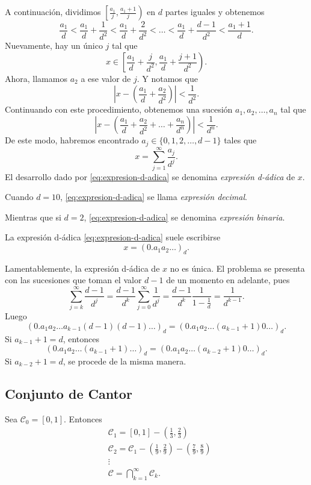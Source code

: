  A continuaci\'on,  dividimos $\left[\frac{a_1}{j}, \frac{a_1+1}{j} \right)$ en $d$ partes iguales y obtenemos
 \[
 \frac{a_1}{d}<\frac{a_1}{d}+\frac{1}{d^2}<\frac{a_1}{d}+\frac{2}{d^2}
 < \ldots<\frac{a_1}{d}+\frac{d-1}{d^2}<\frac{a_1+1}{d}.
 \]
 Nuevamente, hay un \'unico $j$ tal que 
 \[x \in \left[\frac{a_1}{d}+\frac{j}{d^2}, \frac{a_1}{d}+\frac{j+1}{d^2}\right).
 \]
 Ahora, llamamos $a_2$  a ese valor de $j$. Y notamos que 
 \[
 \left|x-\left(\frac{a_1}{d}+\frac{a_2}{d^2}\right)\right|<\frac{1}{d^2}.
 \]
 Continuando con este procedimiento, obtenemos una sucesi\'on $a_1,a_2,\ldots,a_n$ tal que 
 \[
 \left|  
 x-\left( \frac{a_1}{d}+\frac{a_2}{d^2}+\ldots+\frac{a_n}{d^n}\right)
 \right|<\frac{1}{d^n}.
 \]
 De este modo, habremos encontrado $a_j \in \{ 0,1,2,\ldots,d-1\}$ tales que 
 \begin{equation}\label{eq:expresion-d-adica}
 x=\sum\limits_{j=1}^{\infty} \frac{a_j}{d^j}.
 \end{equation}
 El desarrollo dado por  \eqref{eq:expresion-d-adica} se denomina \emph{expresi\'on  d-\'adica} de $x$. 
 
 Cuando $d=10$, \eqref{eq:expresion-d-adica} se llama \emph{expresi\'on decimal}.
 
Mientras que si $d=2$, \eqref{eq:expresion-d-adica} se denomina \emph{expresi\'on binaria}.
 
La expresi\'on d-\'adica \eqref{eq:expresion-d-adica} suele escribirse
\[
x=\left(0.a_1a_2\ldots\right)_d.
\]

Lamentablemente, la expresi\'on d-\'adica de $x$ no es \'unica. El problema se presenta con las sucesiones que toman el valor $d-1$ de un momento en adelante, pues
\[
\sum\limits_{j=k}^{\infty} \frac{d-1}{d^j}=
\frac{d-1}{d^k} \sum\limits_{j=0}^{\infty} \frac{1}{d^j}=
\frac{d-1}{d^k} \frac{1}{1-\frac{1}{d}}=\frac{1}{d^{k-1}}.
\]
Luego
\[
\left(0.a_1a_2\ldots a_{k-1} (d-1) (d-1)\dots\right)_d =
\left(0.a_1a_2\ldots (a_{k-1} +1) 0\dots\right)_d.
\]
 Si $a_{k-1}+1=d$, entonces 
 \[
 \left(0.a_1a_2\ldots (a_{k-1} +1)\dots\right)_d=
 \left(0.a_1a_2\ldots (a_{k-2} +1) 0\dots\right)_d.
\]
Si $a_{k-2}+1=d$, se procede de la misma manera. 


 \subsection{Conjunto de Cantor}
 Sea $\mathscr{C}_0=[0,1]$. 
 Entonces
 \[
 \begin{split}
 &\mathscr{C}_1=[0,1]-\left(\frac{1}{3},\frac{2}{3}\right)
 \\
  &\mathscr{C}_2=\mathscr{C}_1-\left(\frac{1}{9},\frac{2}{9}\right)
   -\left(\frac{7}{9},\frac{8}{9}\right)
   \\
   &\vdots
   \\
   &\mathscr{C}=\bigcap\limits_{k=1}^{\infty} \mathscr{C}_k.
 \end{split}
 \]
 
